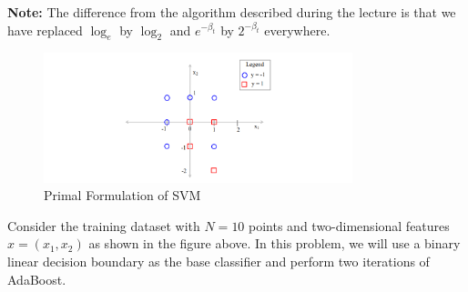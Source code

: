 \documentclass[a3paper,12pt]{extarticle} %
\begin{document}
\textbf{Note:} The difference from the algorithm described during the lecture is that we have replaced $\log_e$ by $\log_2$ and $e^{-\beta_t}$ by $2^{-\beta_t}$ everywhere.
\begin{figure}[h]
    \centering
    \includegraphics[width=0.8\textwidth]{adaboost.png}
    \caption{Primal Formulation of SVM}
    \label{fig:primal}
\end{figure}

Consider the training dataset with $N = 10$ points and two-dimensional features $x = (x_1, x_2)$ as shown in the figure above. In this problem, we will use a binary linear decision boundary as the base classifier and perform two iterations of AdaBoost.
\end{document}
